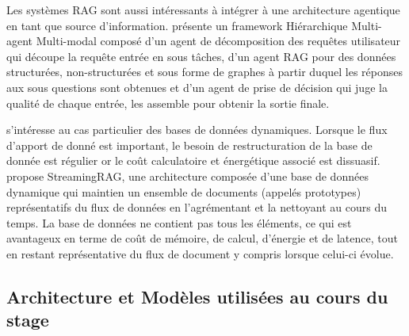         Les systèmes RAG sont aussi intéressants à intégrer à une architecture agentique en tant que source d'information. \cite{liu_hm-rag_2025} présente un framework Hiérarchique Multi-agent Multi-modal composé d'un agent de décomposition des requêtes utilisateur qui découpe la requête entrée en sous tâches, d'un agent RAG pour des données structurées, non-structurées et sous forme de graphes à partir duquel les réponses aux sous questions sont obtenues et d'un agent de prise de décision  qui juge la qualité de chaque entrée, les assemble pour obtenir la sortie finale. 

        \cite{zhu_static_2025} s'intéresse au cas particulier des bases de données dynamiques. Lorsque le flux d'apport de donné est important, le besoin de restructuration de la base de donnée est régulier or le coût calculatoire et énergétique associé est dissuasif. \cite{zhu_static_2025} propose StreamingRAG, une architecture composée d'une base de données dynamique qui maintien un ensemble de documents (appelés prototypes) représentatifs du flux de données en l'agrémentant et la nettoyant au cours du temps. La base de données ne contient pas tous les éléments, ce qui est avantageux en terme de coût de mémoire, de calcul, d'énergie et de latence, tout en restant représentative du flux de document y compris lorsque celui-ci évolue. 


    \subsection{Architecture et Modèles utilisées au cours du stage}


